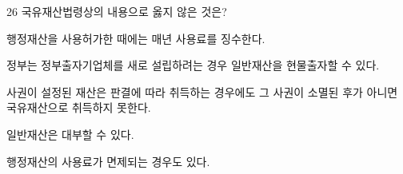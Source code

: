 \begin{question}{26}
국유재산법령상의 내용으로 옳지 않은 것은?
\begin{choices}
  \item 행정재산을 사용허가한 때에는 매년 사용료를 징수한다.
  \item 정부는 정부출자기업체를 새로 설립하려는 경우 일반재산을 현물출자할 수 있다.
  \item 사권이 설정된 재산은 판결에 따라 취득하는 경우에도 그 사권이 소멸된 후가 아니면 국유재산으로 취득하지 못한다.
  \item 일반재산은 대부할 수 있다.
  \item 행정재산의 사용료가 면제되는 경우도 있다.
\end{choices}
\end{question}
